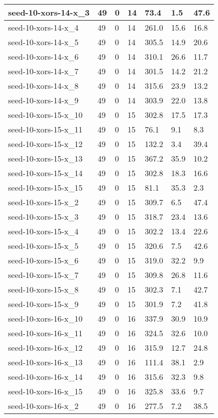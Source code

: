 \begin{scriptsize}
\begin{longtable}{|p{5cm}|l|l|l|l|l|l|}
seed-10-xors-14-x\_3&49&0&14&73.4&1.5&47.6 \\ \hline 
seed-10-xors-14-x\_4&49&0&14&261.0&15.6&16.8 \\ \hline 
seed-10-xors-14-x\_5&49&0&14&305.5&14.9&20.6 \\ \hline 
seed-10-xors-14-x\_6&49&0&14&310.1&26.6&11.7 \\ \hline 
seed-10-xors-14-x\_7&49&0&14&301.5&14.2&21.2 \\ \hline 
seed-10-xors-14-x\_8&49&0&14&315.6&23.9&13.2 \\ \hline 
seed-10-xors-14-x\_9&49&0&14&303.9&22.0&13.8 \\ \hline 
seed-10-xors-15-x\_10&49&0&15&302.8&17.5&17.3 \\ \hline 
seed-10-xors-15-x\_11&49&0&15&76.1&9.1&8.3 \\ \hline 
seed-10-xors-15-x\_12&49&0&15&132.2&3.4&39.4 \\ \hline 
seed-10-xors-15-x\_13&49&0&15&367.2&35.9&10.2 \\ \hline 
seed-10-xors-15-x\_14&49&0&15&302.8&18.3&16.6 \\ \hline 
seed-10-xors-15-x\_15&49&0&15&81.1&35.3&2.3 \\ \hline 
seed-10-xors-15-x\_2&49&0&15&309.7&6.5&47.4 \\ \hline 
seed-10-xors-15-x\_3&49&0&15&318.7&23.4&13.6 \\ \hline 
seed-10-xors-15-x\_4&49&0&15&302.2&13.4&22.6 \\ \hline 
seed-10-xors-15-x\_5&49&0&15&320.6&7.5&42.6 \\ \hline 
seed-10-xors-15-x\_6&49&0&15&319.0&32.2&9.9 \\ \hline 
seed-10-xors-15-x\_7&49&0&15&309.8&26.8&11.6 \\ \hline 
seed-10-xors-15-x\_8&49&0&15&302.3&7.1&42.7 \\ \hline 
seed-10-xors-15-x\_9&49&0&15&301.9&7.2&41.8 \\ \hline 
seed-10-xors-16-x\_10&49&0&16&337.9&30.9&10.9 \\ \hline 
seed-10-xors-16-x\_11&49&0&16&324.5&32.6&10.0 \\ \hline 
seed-10-xors-16-x\_12&49&0&16&315.9&12.7&24.8 \\ \hline 
seed-10-xors-16-x\_13&49&0&16&111.4&38.1&2.9 \\ \hline 
seed-10-xors-16-x\_14&49&0&16&315.6&32.3&9.8 \\ \hline 
seed-10-xors-16-x\_15&49&0&16&325.8&33.6&9.7 \\ \hline 
seed-10-xors-16-x\_2&49&0&16&277.5&7.2&38.5 \\ \hline 

\end{longtable}
\end{scriptsize}
